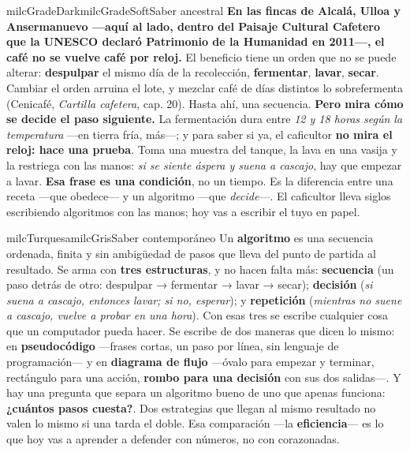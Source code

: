 \documentclass[11pt,letterpaper]{article}
\begin{document}
\begin{softbox}{milcGradeDark}{milcGradeSoft}{Saber ancestral}
\textbf{En las fincas de Alcalá, Ulloa y Ansermanuevo ---aquí al lado, dentro del Paisaje Cultural Cafetero que la UNESCO declaró Patrimonio de la Humanidad en 2011---, el café no se vuelve café por reloj.} El beneficio tiene un orden que no se puede alterar: \textbf{despulpar} el mismo día de la recolección, \textbf{fermentar}, \textbf{lavar}, \textbf{secar}. Cambiar el orden arruina el lote, y mezclar café de días distintos lo sobrefermenta (Cenicafé, \emph{Cartilla cafetera}, cap. 20). Hasta ahí, una secuencia. \textbf{Pero mira cómo se decide el paso siguiente.} La fermentación dura entre \emph{12 y 18 horas según la temperatura} ---en tierra fría, más---; y para saber si ya, el caficultor \textbf{no mira el reloj: hace una prueba}. Toma una muestra del tanque, la lava en una vasija y la restriega con las manos: \emph{si se siente áspera y suena a cascajo}, hay que empezar a lavar. \textbf{Esa frase es una condición}, no un tiempo. Es la diferencia entre una receta ---que obedece--- y un algoritmo ---que \emph{decide}---. El caficultor lleva siglos escribiendo algoritmos con las manos; hoy vas a escribir el tuyo en papel.
\end{softbox}

\begin{softbox}{milcTurquesa}{milcGris}{Saber contemporáneo}
Un \textbf{algoritmo} es una secuencia ordenada, finita y sin ambigüedad de pasos que lleva del punto de partida al resultado. Se arma con \textbf{tres estructuras}, y no hacen falta más: \textbf{secuencia} (un paso detrás de otro: despulpar → fermentar → lavar → secar); \textbf{decisión} (\emph{si suena a cascajo, entonces lavar; si no, esperar}); y \textbf{repetición} (\emph{mientras no suene a cascajo, vuelve a probar en una hora}). Con esas tres se escribe cualquier cosa que un computador pueda hacer. Se escribe de dos maneras que dicen lo mismo: en \textbf{pseudocódigo} ---frases cortas, un paso por línea, sin lenguaje de programación--- y en \textbf{diagrama de flujo} ---óvalo para empezar y terminar, rectángulo para una acción, \textbf{rombo para una decisión} con sus dos salidas---. Y hay una pregunta que separa un algoritmo bueno de uno que apenas funciona: \textbf{¿cuántos pasos cuesta?}. Dos estrategias que llegan al mismo resultado no valen lo mismo si una tarda el doble. Esa comparación ---la \textbf{eficiencia}--- es lo que hoy vas a aprender a defender con números, no con corazonadas.
\end{softbox}
\end{document}
